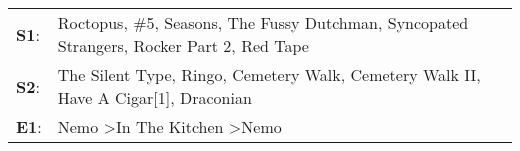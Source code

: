\begin{supertabular}{p{0.03\textwidth}p{0.92\textwidth}}
 \textbf{S1}:  &  Roctopus\textsuperscript{}, \enspace \#5\textsuperscript{}, \enspace Seasons\textsuperscript{}, \enspace The Fussy Dutchman\textsuperscript{}, \enspace Syncopated Strangers\textsuperscript{}, \enspace Rocker Part 2\textsuperscript{}, \enspace Red Tape\textsuperscript{}  \enspace  \\
 \textbf{S2}:  &                                   The Silent Type\textsuperscript{}, \enspace Ringo\textsuperscript{}, \enspace Cemetery Walk\textsuperscript{}, \enspace Cemetery Walk II\textsuperscript{}, \enspace Have A Cigar[1]\textsuperscript{}, \enspace Draconian\textsuperscript{}  \enspace  \\
 \textbf{E1}:  &                                                                                                                                                     Nemo\textsuperscript{} \textgreater \enspace In The Kitchen\textsuperscript{} \textgreater \enspace Nemo\textsuperscript{}  \enspace  \\
\end{supertabular}
